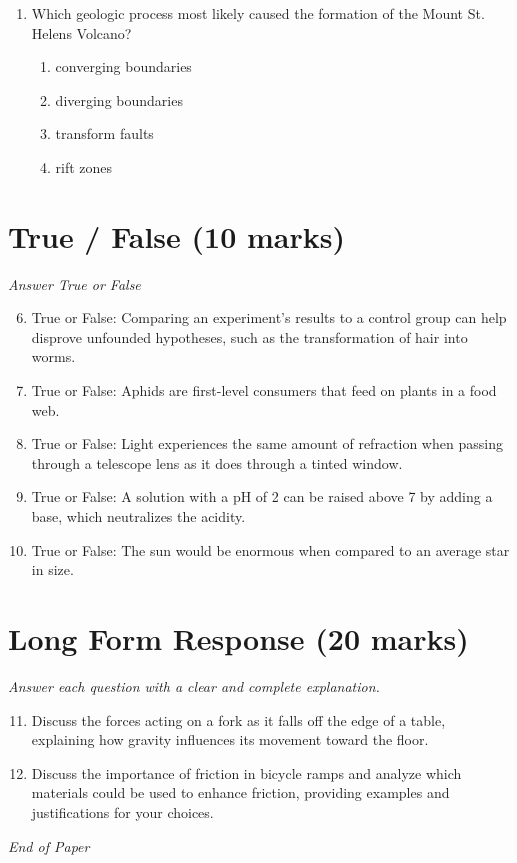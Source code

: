 \documentclass[12pt]{article}
\begin{document}
\begin{enumerate}[label=\arabic*.]
\begin{enumerate}[label=(\alph*)]
    \item planting a tree
    \item adding a freshwater source
    \item creating a nature sanctuary
\end{enumerate}
\item Which geologic process most likely caused the formation of the Mount St. Helens Volcano?
\begin{enumerate}[label=(\alph*)]
    \item converging boundaries
    \item diverging boundaries
    \item transform faults
    \item rift zones
\end{enumerate}
\end{enumerate}

\section*{True / False (10 marks)}
\textit{Answer True or False}
\begin{enumerate}[label=\arabic*.]
\setcounter{enumi}{5}
\item True or False: Comparing an experiment's results to a control group can help disprove unfounded hypotheses, such as the transformation of hair into worms.
\item True or False: Aphids are first-level consumers that feed on plants in a food web.
\item True or False: Light experiences the same amount of refraction when passing through a telescope lens as it does through a tinted window.
\item True or False: A solution with a pH of 2 can be raised above 7 by adding a base, which neutralizes the acidity.
\item True or False: The sun would be enormous when compared to an average star in size.
\end{enumerate}

\section*{Long Form Response (20 marks)}
\textit{Answer each question with a clear and complete explanation.}
\begin{enumerate}[label=\arabic*.]
\setcounter{enumi}{10}
\item Discuss the forces acting on a fork as it falls off the edge of a table, explaining how gravity influences its movement toward the floor.
\item Discuss the importance of friction in bicycle ramps and analyze which materials could be used to enhance friction, providing examples and justifications for your choices.
\end{enumerate}

\vfill
\noindent\textit{End of Paper}
\end{document}
